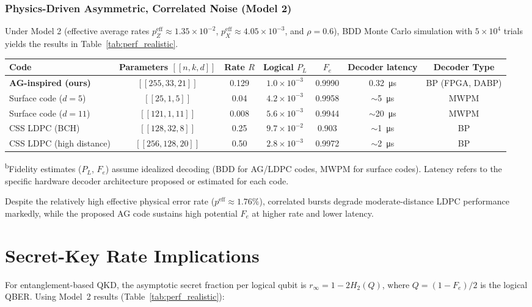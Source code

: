 \documentclass[conference]{IEEEtran}
\begin{document}
\subsubsection{Physics-Driven Asymmetric, Correlated Noise (Model 2)}\label{sec:realistic}
Under Model 2 (effective average rates \(p_Z^{\mathrm{eff}}\approx1.35\times10^{-2}\), \(p_X^{\mathrm{eff}}\approx4.05\times10^{-3}\), and \(\rho=0.6\)), BDD Monte Carlo simulation with \(5\times10^4\) trials yields the results in Table~\ref{tab:perf_realistic}.

\begin{table*}[t]
\centering
\caption{Performance under Model 2 (asymmetric, correlated; effective \(p^{\mathrm{eff}}\approx1.76\times10^{-2}\)).\textsuperscript{b}}
\label{tab:perf_realistic}
\begin{tabular}{lcccccc}
\toprule
\textbf{Code} & \textbf{Parameters $[[n,k,d]]$} & \textbf{Rate $R$} & \textbf{Logical $P_L$} & \textbf{$F_e$} & \textbf{Decoder latency} & \textbf{Decoder Type} \\
\midrule
\textbf{AG-inspired (ours)} & $[[255,33,21]]$ & 0.129 & \(1.0\times 10^{-3}\) & 0.9990 & \SI{0.32}{\micro\second} & BP (FPGA, DABP) \\
Surface code ($d=5$) & $[[25,1,5]]$ & 0.04 & \(4.2\times 10^{-3}\) & 0.9958 & \(\sim\)\SI{5}{\micro\second} & MWPM \\
Surface code ($d=11$) & $[[121,1,11]]$ & 0.008 & \(5.6\times 10^{-3}\) & 0.9944 & \(\sim\)\SI{20}{\micro\second} & MWPM \\
CSS LDPC (BCH) & $[[128,32,8]]$ & 0.25 & \(9.7\times 10^{-2}\) & 0.903 & \(\sim\)\SI{1}{\micro\second} & BP \\
CSS LDPC (high distance) & $[[256,128,20]]$ & 0.50 & \(2.8\times 10^{-3}\) & 0.9972 & \(\sim\)\SI{2}{\micro\second} & BP \\
\bottomrule
\end{tabular}
\textsuperscript{b}{\footnotesize Fidelity estimates ($P_L$, $F_e$) assume idealized decoding (BDD for AG/LDPC codes, MWPM for surface codes). Latency refers to the specific hardware decoder architecture proposed or estimated for each code.}
\end{table*}

Despite the relatively high effective physical error rate (\(p^{\mathrm{eff}}\approx1.76\%\)), correlated bursts degrade moderate-distance LDPC performance markedly, while the proposed AG code sustains high potential \(F_e\) at higher rate and lower latency.

\section{Secret-Key Rate Implications}\label{sec:finitekey}
For entanglement-based QKD, the asymptotic secret fraction per logical qubit is \(r_\infty=1-2H_2(Q)\), where \(Q=(1-F_e)/2\) is the logical QBER. Using Model~2 results (Table~\ref{tab:perf_realistic}):
\end{document}
